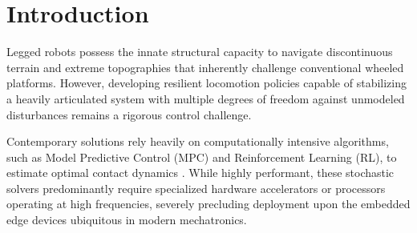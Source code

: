 \section{Introduction}

Legged robots possess the innate structural capacity to navigate
discontinuous terrain and extreme topographies that inherently
challenge conventional wheeled platforms.
However, developing resilient locomotion policies capable of
stabilizing a heavily articulated system with multiple degrees of
freedom against unmodeled disturbances remains a rigorous control
challenge.

Contemporary solutions rely heavily on computationally intensive
algorithms, such as Model Predictive Control (MPC) and
Reinforcement Learning (RL), to estimate optimal contact dynamics
\cite{gehring2013control, dicarlo2018dynamic}.
While highly performant, these stochastic solvers predominantly
require specialized hardware accelerators or processors operating
at high frequencies, severely
precluding deployment upon the embedded edge devices ubiquitous in
modern mechatronics.

